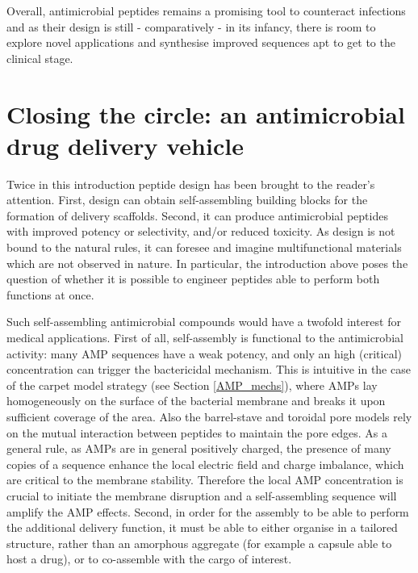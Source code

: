Overall, antimicrobial peptides remains a promising tool to counteract infections and as their design is still - comparatively - in its infancy, there is room to explore novel applications and synthesise improved sequences apt to get to the clinical stage.


\section{Closing the circle: an antimicrobial drug delivery vehicle}

Twice in this introduction peptide design has been brought to the reader's attention. First, design can obtain self-assembling building blocks for the formation of delivery scaffolds. Second, it can produce antimicrobial peptides with improved potency or selectivity, and/or reduced toxicity. As design is not bound to the natural rules, it can foresee and imagine multifunctional materials which are not observed in nature. In particular, the introduction above poses the question of whether it is possible to engineer peptides able to perform both functions at once.

Such self-assembling antimicrobial compounds would have a twofold interest for medical applications.
%
First of all, self-assembly is functional to the antimicrobial activity: many AMP sequences have a weak potency, and only an high (critical) concentration can trigger the bactericidal mechanism. This is intuitive in the case of the carpet model strategy (see Section \ref{AMP_mechs}), where AMPs lay homogeneously on the surface of the bacterial membrane and breaks it upon sufficient coverage of the area. Also the barrel-stave and toroidal pore models rely on the mutual interaction between peptides to maintain the pore edges. As a general rule, as AMPs are in general positively charged, the presence of many copies of a sequence enhance the local electric field and charge imbalance, which are critical to the membrane stability.
%
Therefore the local AMP concentration is crucial to initiate the membrane disruption and a self-assembling sequence will amplify the AMP effects. 
%
Second, in order for the assembly to be able to perform the additional delivery function, it must be able to either organise in a tailored structure, rather than an amorphous aggregate (for example a capsule able to host a drug), or to co-assemble with the cargo of interest.

